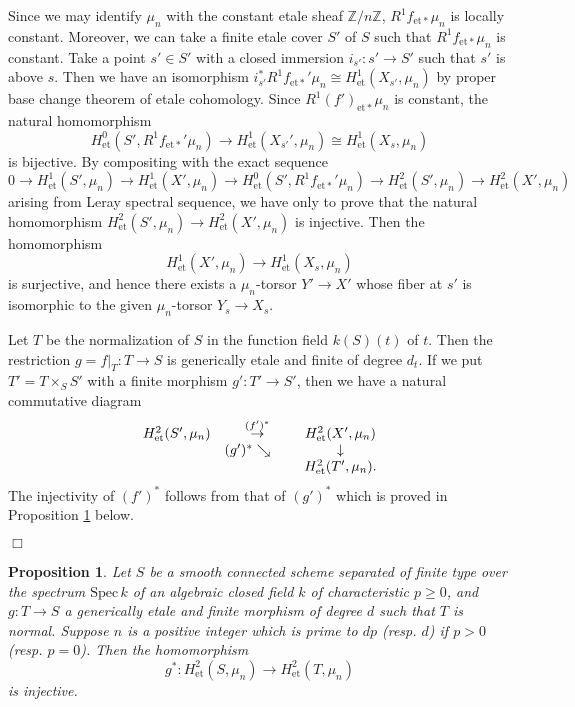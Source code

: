 \documentclass[11pt]{amsart}
\newtheorem{proposition}[Lemma]{Proposition}
\begin{document}
{ {Since we may identify $\mu_n$ with the constant etale sheaf $\mathbb Z/n\mathbb Z$, 
$R^1f_{\mathrm{et}\ast}\mu_n$ is locally constant. Moreover, we can take 
a finite etale cover $S'$ of $S$ such that $R^1f_{\mathrm{et}\ast}\mu_n$ is constant. 
Take a point $s' \in S'$ with a closed immersion $i_{s'} : s' \rightarrow S'$ 
such that $s'$ is above $s$. Then we have an 
isomorphism $i_{s'}^\ast R^1f_{\mathrm{et}\ast}'\mu_n \cong H_{\mathrm{et}}^1(X_{s'}, \mu_n)$ 
by proper base change theorem of etale cohomology. 
Since $R^1(f')_{\mathrm{et}\ast}\mu_n$ is constant, the natural homomorphism 
$$
      H_{\mathrm{et}}^0(S', R^1f_{\mathrm{et}\ast}'\mu_n) \rightarrow 
      H_{\mathrm{et}}^1(X_{s'}', \mu_n) \cong H_{\mathrm{et}}^1(X_s, \mu_n)
$$
is bijective. By compositing with the exact sequence 
$$
    0 \rightarrow H^1_{\mathrm{et}}(S', \mu_n) \rightarrow H^1_{\mathrm{et}}(X', \mu_n) 
    \rightarrow H_{\mathrm{et}}^0(S', R^1f_{\mathrm{et}\ast}'\mu_n) 
    \rightarrow H^2_{\mathrm{et}}(S', \mu_n) \rightarrow H^2_{\mathrm{et}}(X', \mu_n) 
$$
arising from Leray spectral sequence, 
we have only to prove that 
the natural homomorphism $H^2_{\mathrm{et}}(S', \mu_n) \rightarrow H^2_{\mathrm{et}}(X', \mu_n)$ is injective. 
Then the homomorphism 
$$
      H^1_{\mathrm{et}}(X', \mu_n) \rightarrow H_{\mathrm{et}}^1(X_s, \mu_n)
$$
is surjective, and hence there exists a $\mu_n$-torsor $Y' \rightarrow X'$ whose fiber at $s'$ is isomorphic to 
the given $\mu_n$-torsor $Y_s \rightarrow X_s$. 

Let $T$ be the normalization of $S$ in the function field $k(S)(t)$ of $t$. 
Then the restriction $g = f|_T : T \rightarrow S$ is generically etale and finite of degree $d_t$. 
If we put $T' = T\times_S S'$ with a finite morphism $g' : T' \rightarrow S'$, then we have a natural commutative diagram 
$$
     \begin{array}{ccccc}
          H^2_{\mathrm{et}}(S', \mu_n) &\overset{(f')^\ast}{\rightarrow} &H^2_{\mathrm{et}}(X', \mu_n) \\
          &(g')^\ast \searrow \hspace*{5mm}&\downarrow \\
          & &H^2_{\mathrm{et}}(T', \mu_n). 
     \end{array}
$$
The injectivity of $(f')^\ast$ follows from that of $(g')^\ast$ which is proved in Proposition \ref{inj} below. 
} \hspace*{\fill} $\Box$}

\begin{proposition}\label{inj} 
Let $S$ be a smooth connected scheme separated of finite type over the 
spectrum $\mathrm{Spec}\, k$ of an algebraic closed field $k$ of characteristic $p \geq 0$, 
and $g : T \rightarrow S$ a generically etale and finite morphism of degree $d$ 
such that $T$ is normal. 
Suppose $n$ is a positive integer which is prime to $dp$ (resp. $d$) if $p > 0$ (resp. $p = 0$). 
Then the homomorphism 
$$
       g^\ast : H_{\mathrm{et}}^2(S, \mu_n) \rightarrow H_{\mathrm{et}}^2(T, \mu_n)
$$
is injective. 
\end{proposition}
\end{document}
